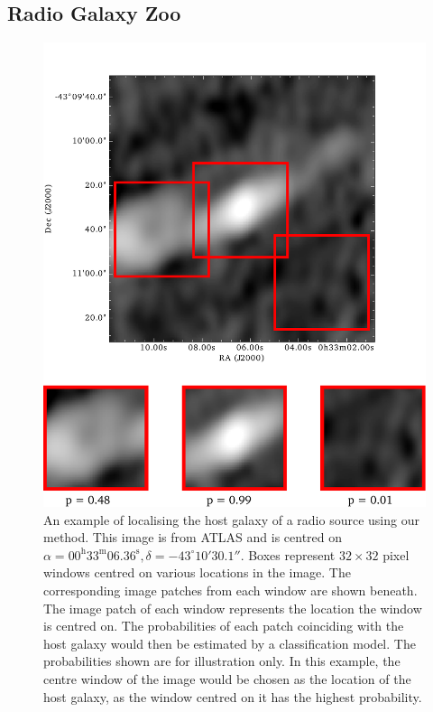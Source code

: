 \documentclass[fleqn,usenatbib,usedcolumn]{mnras}
\begin{document}
  \subsection{Radio Galaxy Zoo}\label{sec:rgz}
    \begin{figure}
      \centering
      \includegraphics[width=0.8\columnwidth]{images/elais_0093C1_with_boxes}
      \caption{An example of localising the host galaxy of a radio source using
        our method. This image is from ATLAS and is centred on $\alpha =
        00^\text{h}33^\text{m}06.36^\text{s}, \delta = -43^\circ{}10'30.1''$. Boxes
        represent $32 \times 32$ pixel windows centred on various locations in
        the image. The corresponding image patches from each window are shown
        beneath. The image patch of each window represents the location the
        window is centred on. The probabilities of each patch coinciding with
        the host galaxy would then be estimated by a classification model. The
        probabilities shown are for illustration only. In this example, the
        centre window of the image would be chosen as the location of the host
        galaxy, as the window centred on it has the highest probability.}
      \label{fig:windows}
    \end{figure}
    
\end{document}
